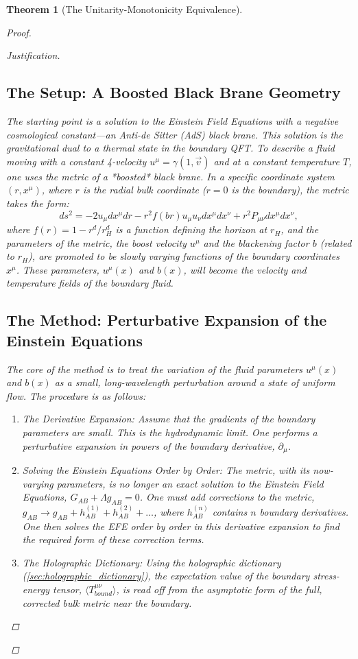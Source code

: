 \documentclass[11pt, letterpaper]{report}
\theoremstyle{plain} %
\newtheorem{theorem}{Theorem}[chapter]
\theoremstyle{definition} %
\theoremstyle{remark} %
\begin{document}
\begin{theorem}[The Unitarity-Monotonicity Equivalence]
\begin{proof}
\begin{proof}[Justification]
\subsection{The Setup: A Boosted Black Brane Geometry}
The starting point is a solution to the Einstein Field Equations with a negative cosmological constant—an Anti-de Sitter (AdS) black brane. This solution is the gravitational dual to a thermal state in the boundary QFT. To describe a fluid moving with a constant 4-velocity $u^\mu = \gamma(1, \vec{v})$ and at a constant temperature $T$, one uses the metric of a *boosted* black brane. In a specific coordinate system $(r, x^\mu)$, where $r$ is the radial bulk coordinate ($r=0$ is the boundary), the metric takes the form:
\begin{equation}
    ds^2 = -2u_\mu dx^\mu dr - r^2 f(b r) u_\mu u_\nu dx^\mu dx^\nu + r^2 P_{\mu\nu} dx^\mu dx^\nu,
\end{equation}
where $f(r) = 1 - r^d/r_H^d$ is a function defining the horizon at $r_H$, and the parameters of the metric, the boost velocity $u^\mu$ and the blackening factor $b$ (related to $r_H$), are promoted to be slowly varying functions of the boundary coordinates $x^\mu$. These parameters, $u^\mu(x)$ and $b(x)$, will become the velocity and temperature fields of the boundary fluid.

\subsection{The Method: Perturbative Expansion of the Einstein Equations}
The core of the method is to treat the variation of the fluid parameters $u^\mu(x)$ and $b(x)$ as a small, long-wavelength perturbation around a state of uniform flow. The procedure is as follows:
\begin{enumerate}
    \item The Derivative Expansion: Assume that the gradients of the boundary parameters are small. This is the hydrodynamic limit. One performs a perturbative expansion in powers of the boundary derivative, $\partial_\mu$.
    \item Solving the Einstein Equations Order by Order: The metric, with its now-varying parameters, is no longer an exact solution to the Einstein Field Equations, $G_{AB} + \Lambda g_{AB} = 0$. One must add corrections to the metric, $g_{AB} \to g_{AB} + h_{AB}^{(1)} + h_{AB}^{(2)} + \dots$, where $h_{AB}^{(n)}$ contains $n$ boundary derivatives. One then solves the EFE order by order in this derivative expansion to find the required form of these correction terms.
    \item The Holographic Dictionary: Using the holographic dictionary (\cref{sec:holographic_dictionary}), the expectation value of the boundary stress-energy tensor, $\langle T^{\mu\nu}_{bound} \rangle$, is read off from the asymptotic form of the full, corrected bulk metric near the boundary.
\end{enumerate}


\end{proof}
\end{proof}
\end{theorem}
\end{document}
